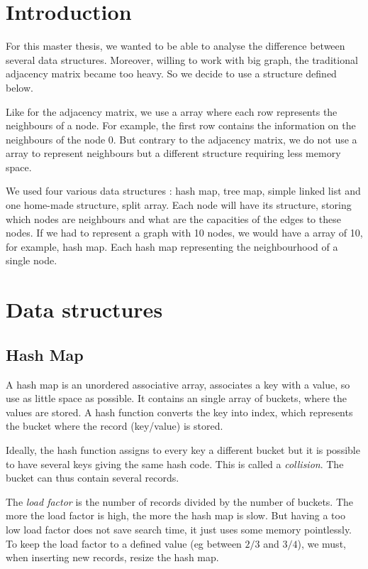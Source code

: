 \section{Introduction}
For this master thesis, we wanted to be able to analyse the difference between several data structures. Moreover, willing to work with big graph, the traditional adjacency matrix became too heavy. So we decide to use a structure defined below. \newline

Like for the adjacency matrix, we use a array where each row represents the neighbours of a node. For example, the first row contains the information on the neighbours of the node 0. But contrary to the adjacency matrix, we do not use a array to represent neighbours but a different structure requiring less memory space. \newline

We used four various data structures : hash map, tree map, simple linked list and one home-made structure, split array. Each node will have its structure, storing which nodes are neighbours and what are the capacities of the edges to these nodes. If we had to represent a graph with 10 nodes, we would have a array of 10, for example, hash map. Each hash map representing the neighbourhood of a single node.

\section{Data structures}
\subsection{Hash Map}
A hash map is an unordered associative array, associates a key with a value, so use as little space as possible. It contains an single array of buckets, where the values are stored. A hash function converts the key into index, which represents the bucket where the record (key/value) is stored. \newline

Ideally, the hash function assigns to every key a different bucket but it is possible to have several keys giving the same hash code. This is called a \textit{collision}. The bucket can thus contain several records. \newline

The \textit{load factor} is the number of records divided by the number of buckets.  The more the load factor is high, the more the hash map is slow. But having a too low load factor does not save search time, it just uses some memory pointlessly. To keep the load factor to a defined value (eg between $2/3$ and $3/4$), we must, when inserting new records, resize the hash map. \newline

